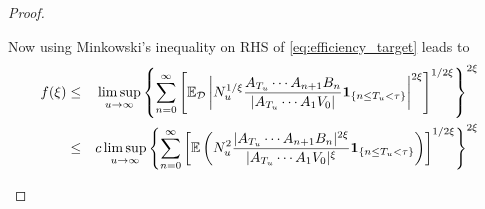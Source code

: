\documentclass{article}
\theoremstyle{remark}
\begin{document}
\begin{proof}
\begin{enumerate}
    Now using Minkowski's inequality on RHS of
    \eqref{eq:efficiency_target} leads to
      \begin{eqnarray*}
        f(\xi) &\leq& \limsup_{u \to \infty}
        \left\{
          \sum_{n=0}^{\infty}
          \left[
            \mathbb{E}_{\mathcal D} \left|
              N_u^{1/\xi}
              \frac{
                A_{T_u} \cdots A_{n+1} B_n 
              }{
                |A_{T_u} \cdots A_1 V_0|
              }
              \mathbf{1}_{\{n \leq T_u < \tau\}}
            \right|^{2 \xi}
          \right]^{1/2\xi}
        \right\}^{2\xi} \\
        &\leq& c \limsup_{u \to \infty}
        \left\{
          \sum_{n=0}^{\infty}
          \left[
            \mathbb{E} \left(
              N_u^2
              \frac{
                |A_{T_u} \cdots A_{n+1} B_n|^{2\xi}
              }{
                |A_{T_u} \cdots A_1 V_0|^\xi
              }
              \mathbf{1}_{\{n \leq T_u < \tau\}}
            \right)
          \right]^{1/2\xi}
        \right\}^{2\xi}
      \end{eqnarray*}
  \end{enumerate}
\end{proof}




\end{document}
